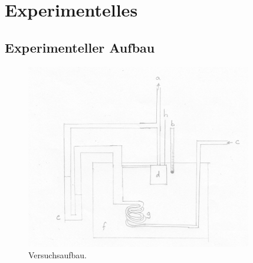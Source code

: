 \documentclass[a4paper,12pt,oneside,onecolum,final,openany]{report}
\begin{document}
\begin{titlepage}

\vspace{1.3cm} 

\end{titlepage}

\tableofcontents
\chapter{Experimentelles}
\section{Experimenteller Aufbau}
\begin{figure} [h!]
\begin{center}
\includegraphics[scale=1.2]{VersuchsaufbauJT.png} \end{center}
\caption{Versuchsaufbau.}
\end{figure}
\FloatBarrier
\end{document}
